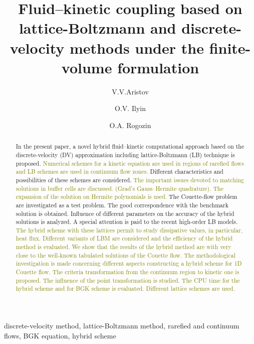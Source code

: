 \documentclass[]{elsarticle} %
\newcommand{\todo}[1]{\textcolor{olive}{#1}}
\begin{document}
\begin{frontmatter}

\title{Fluid--kinetic coupling based on lattice-Boltzmann and discrete-velocity methods under the finite-volume formulation}

\author{V.V.Aristov}

\author{O.V. Ilyin}

\author{O.A. Rogozin}


\begin{abstract}

In the present paper, a novel hybrid fluid--kinetic computational approach based on the discrete-velocity (DV)
approximation including lattice-Boltzmann (LB) technique is proposed.
\todo{Numerical schemes for a kinetic equation are used in regions of rarefied flows and LB schemes are used in continuum flow zones.}
Different characteristics and possibilities of these schemes are considered.
\todo{The important issues devoted to matching solutions in buffer cells are discussed.}
\todo{(Grad's Gauss--Hermite quadrature). The expansion of the solution on Hermite polynomials is used.}
The Couette-flow problem are investigated as a test problem.
The good correspondence with the benchmark solution is obtained.
Influence of different parameters on the accuracy of the hybrid solutions is analyzed.
A special attention is paid to the recent high-order LB models.
\todo{The hybrid scheme with these lattices permit to study dissipative values, in particular, heat flux.}
\todo{Different variants of LBM are considered and the efficiency of the hybrid method is evaluated. We show that the results of the hybrid method are with very close to the well-known tabulated solutions of the Couette flow.
The methodological investigation is made concerning different aspects constructing a hybrid scheme for 1D Couette flow. The criteria transformation from the continuum region to kinetic one is proposed. The influence of the point transformation is studied. The CPU time for the hybrid scheme and for BGK scheme is evaluated. Different lattice schemes are used.}

\end{abstract}

\begin{keyword}
discrete-velocity method, lattice-Boltzmann method, rarefied and continuum flows, BGK equation, hybrid scheme
\end{keyword}

\end{frontmatter}
\end{document}
